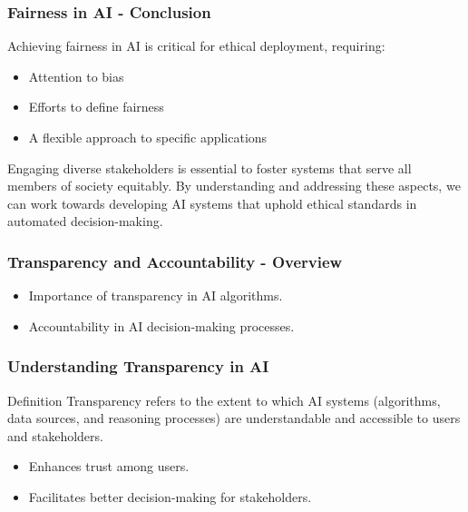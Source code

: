 \documentclass{beamer}
\begin{document}
\begin{frame}[fragile]
    \frametitle{Fairness in AI - Conclusion}
    Achieving fairness in AI is critical for ethical deployment, requiring:
    \begin{itemize}
        \item Attention to bias
        \item Efforts to define fairness
        \item A flexible approach to specific applications
    \end{itemize}
    Engaging diverse stakeholders is essential to foster systems that serve all members of society equitably. By understanding and addressing these aspects, we can work towards developing AI systems that uphold ethical standards in automated decision-making.
\end{frame}

\begin{frame}[fragile]
    \frametitle{Transparency and Accountability - Overview}
    \begin{itemize}
        \item Importance of transparency in AI algorithms.
        \item Accountability in AI decision-making processes.
    \end{itemize}
\end{frame}

\begin{frame}[fragile]
    \frametitle{Understanding Transparency in AI}
    \begin{block}{Definition}
        Transparency refers to the extent to which AI systems (algorithms, data sources, and reasoning processes) are understandable and accessible to users and stakeholders.
    \end{block}
    \begin{itemize}
        \item Enhances trust among users.
        \item Facilitates better decision-making for stakeholders.
    \end{itemize}
\end{frame}
\end{document}
